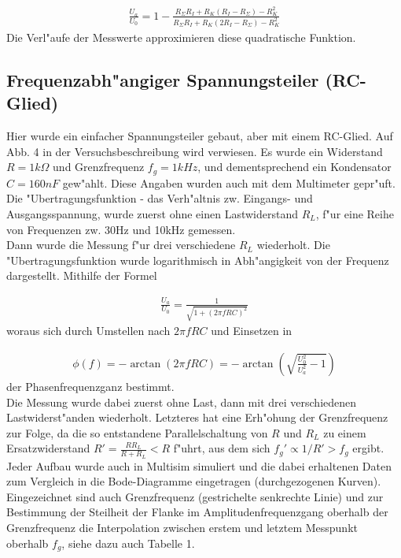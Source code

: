 \documentclass[10pt]{article}
\begin{document}
\begin{eqnarray}
 \frac{U_a}{U_0} = 1-\frac{R_{\Sigma}R_I+R_K(R_I-R_{\Sigma})-R_K^2}{R_{\Sigma}R_I+R_K(2R_I-R_{\Sigma})-R_K^2}
\end{eqnarray}
\noindent
Die Verl"aufe der Messwerte approximieren diese quadratische Funktion.
\newpage
\subsection{Frequenzabh"angiger Spannungsteiler (RC-Glied)}

Hier wurde ein einfacher Spannungsteiler gebaut, aber mit einem RC-Glied. Auf Abb. 4 in der Versuchsbeschreibung wird verwiesen. Es wurde ein Widerstand $R=1k\Omega$ und Grenzfrequenz $f_g=1kHz$, und dementsprechend ein Kondensator $C=160nF$ gew"ahlt. Diese Angaben wurden auch mit dem Multimeter gepr"uft. Die "Ubertragungsfunktion - das Verh"altnis zw. Eingangs- und Ausgangsspannung, wurde zuerst ohne einen Lastwiderstand $R_L$, f"ur eine Reihe von Frequenzen zw. 30Hz und 10kHz gemessen.\\

Dann wurde die Messung f"ur drei verschiedene $R_L$ wiederholt. Die "Ubertragungsfunktion wurde logarithmisch in Abh"angigkeit von der Frequenz dargestellt. Mithilfe der Formel

\begin{eqnarray}
 \frac{U_a}{U_0} = \frac{1}{\sqrt{1+(2\pi fRC)^2}}
\end{eqnarray}
\noindent
woraus sich durch Umstellen nach $2\pi fRC$ und Einsetzen in

\begin{eqnarray}
 \phi (f) = -\arctan(2\pi fRC) = -\arctan(\sqrt{\frac{U_0^2}{U_a^2}-1})
\end{eqnarray}
\noindent
der Phasenfrequenzganz bestimmt.\\

Die Messung wurde dabei zuerst ohne Last, dann mit drei verschiedenen Lastwiderst"anden wiederholt. Letzteres hat eine Erh"ohung der Grenzfrequenz zur Folge, da die so entstandene Parallelschaltung von $R$ und $R_L$ zu einem Ersatzwiderstand $R'=\frac{RR_L}{R+R_L}<R$ f"uhrt, aus dem sich $f_g'\propto{1/R'}>f_g$ ergibt.\\

Jeder Aufbau wurde auch in Multisim simuliert und die dabei erhaltenen Daten zum Vergleich in die Bode-Diagramme eingetragen (durchgezogenen Kurven). Eingezeichnet sind auch Grenzfrequenz (gestrichelte senkrechte Linie) und zur Bestimmung der Steilheit der Flanke im Amplitudenfrequenzgang oberhalb der Grenzfrequenz die Interpolation zwischen erstem und letztem Messpunkt oberhalb $f_g$, siehe dazu auch Tabelle 1.\\ %
\end{document}
